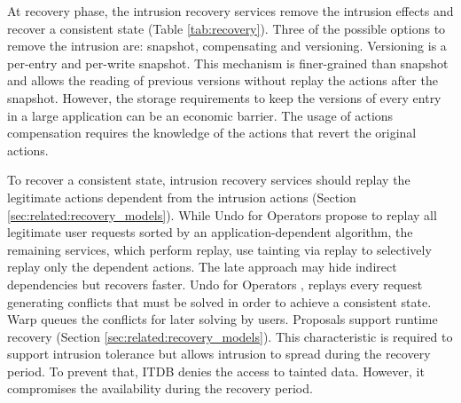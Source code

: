 At recovery phase, the intrusion recovery services remove the intrusion effects and recover a consistent state  (Table \ref{tab:recovery}). Three of the possible options to remove the intrusion are: snapshot, compensating and versioning. Versioning is a per-entry and per-write snapshot. This mechanism is finer-grained than snapshot and allows the reading of previous versions without replay the actions after the snapshot. However, the storage requirements to keep the versions of every entry in a large application can be an economic barrier. The usage of actions compensation requires the knowledge of the actions that revert the original actions.

To recover a consistent state, intrusion recovery services should replay the legitimate actions dependent from the intrusion actions (Section \ref{sec:related:recovery_models}). While Undo for Operators \cite{undoForOperators} propose to replay all legitimate user requests sorted by an application-dependent algorithm, the remaining services, which perform replay, use tainting via replay to selectively replay only the dependent actions. The late approach may hide indirect dependencies \cite{Xie2008} but recovers faster. Undo for Operators \cite{undoForOperators}, replays every request generating conflicts that must be solved in order to achieve a consistent state. Warp \cite{warp} queues the conflicts for later solving by users. Proposals \cite{itdb,phoenix,warp,aire} support runtime recovery (Section \ref{sec:related:recovery_models}). This characteristic is required to support intrusion tolerance but allows intrusion to spread during the recovery period. To prevent that, ITDB \cite{itdb} denies the access to tainted data. However, it compromises the availability during the recovery period.\\